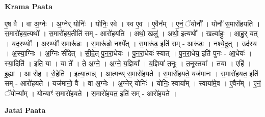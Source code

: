 \documentclass[17pt]{extarticle}
\begin{document}
\textbf{Krama Paata} \newline

ए॒ष वै । वा अ॒ग्नेः । अ॒ग्नेर् योनिः॑ । योनिः॒ स्वे । स्व ए॒व । ए॒वैन᳚म् । ए॒नं॒ ॅयोनौ᳚ । योनौ॑ स॒मारो॑हयति । स॒मारो॑हय॒त्यथो᳚ । स॒मारो॑हय॒तीति॑ सम् - आरो॑हयति । अथो॒ खलु॑ । अथो॒ इत्यथो᳚ । खल्वा॑हुः । आ॒हु॒र् यत् । यद॒रण्योः᳚ । अ॒रण्योः᳚ स॒मारू॑ढः । स॒मारू॑ढो॒ नश्ये᳚त् । स॒मारू॑ढ॒ इति॑ सम् - आरू॑ढः । नश्ये॒दुत् । उद॑स्य । अ॒स्या॒ग्निः । अ॒ग्निः सी॑देत् । सी॒दे॒त् पु॒न॒रा॒धेयः॑ । पु॒न॒रा॒धेयः॑ स्यात् । पु॒न॒रा॒धेय॒ इति॑ पुनः - आ॒धेयः॑ । स्या॒दिति॑ । इति॒ या । या ते᳚ । ते॒ अ॒ग्ने॒ । अ॒ग्ने॒ य॒ज्ञिया᳚ । य॒ज्ञिया॑ त॒नूः । त॒नूस्तया᳚ । तया । एहि॑ । इ॒ह्या । आ रो॑ह । रो॒हेति॑ । इत्या॒त्मन्न् । आ॒त्मन्थ् स॒मारो॑हयते । स॒मारो॑हयते॒ यज॑मानः । स॒मारो॑हयत॒ इति॑ सम् - आरो॑हयते । यज॑मानो॒ वै । वा अ॒ग्नेः । अ॒ग्नेर् योनिः॑ । योनिः॒ स्वाया᳚म् । स्वाया॑मे॒व । ए॒वैन᳚म् । ए॒नं॒ ॅयोन्या᳚म् । योन्याꣳ॑ स॒मारो॑हयते । स॒मारो॑हयत॒ इति॑ सम् - आरो॑हयते । \newline

\textbf{Jatai Paata} \newline
\end{document}
